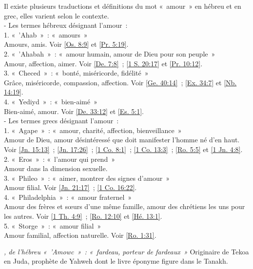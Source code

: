 \begin{multicols}{2}
\textit{}\newline
Il existe plusieurs traductions et définitions du mot «~amour~» en hébreu et en grec, elles varient selon le contexte.
\\- Les termes hébreux désignant l'amour~:
\\1. «~'Ahab~»~: «~amours~»
\\Amours, amis. Voir \vref{Os. 8:9} et \vref{Pr. 5:19}.
\\2. «~'Ahabah~»~: «~amour humain, amour de Dieu pour son peuple~»
\\Amour, affection, aimer. Voir \vref{De. 7:8}~; \vref{1 S. 20:17} et \vref{Pr. 10:12}.
\\3. «~Checed~»~: «~bonté, miséricorde, fidélité~»
\\Grâce, miséricorde, compassion, affection. Voir \vref{Ge. 40:14}~; \vref{Ex. 34:7} et \vref{Nb. 14:19}.
\\4. «~Yediyd~»~: «~bien-aimé~»
\\Bien-aimé, amour. Voir \vref{De. 33:12} et \vref{Es. 5:1}.
\\- Les termes grecs désignant l'amour~:
\\1. «~Agape~»~: «~amour, charité, affection, bienveillance~»
\\Amour de Dieu, amour désintéressé que doit manifester l'homme né d'en haut. Voir \vref{Jn. 15:13}~; \vref{Jn. 17:26}~; \vref{1 Co. 8:1}~; \vref{1 Co. 13:3}~; \vref{Ro. 5:5} et \vref{1 Jn. 4:8}.
\\2. «~Eros~»~: «~l'amour qui prend~»
\\Amour dans la dimension sexuelle.
\\3. «~Phileo~»~: «~aimer, montrer des signes d'amour~»
\\Amour filial. Voir \vref{Jn. 21:17}~; \vref{1 Co. 16:22}.
\\4. «~Philadelphia~»~: «~amour fraternel~»
\\Amour des frères et sœurs d'une même famille, amour des chrétiens les uns pour les autres. Voir \vref{1 Th. 4:9}~; \vref{Ro. 12:10} et \vref{Hé. 13:1}.
\\5. «~Storge~»~: «~amour filial~»
\\Amour familial, affection naturelle. Voir \vref{Ro. 1:31}.

\textit{, de l'hébreu «~'Amowc~»~: «~fardeau, porteur de fardeaux~»}\newline
Originaire de Tekoa en Juda, prophète de Yahweh dont le livre éponyme figure dans le Tanakh.


\end{multicols}
